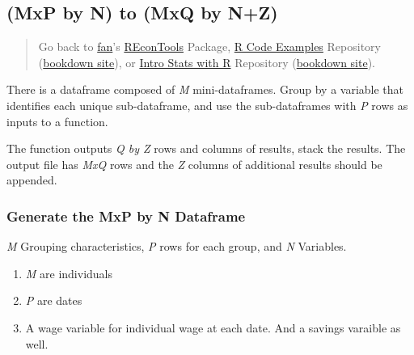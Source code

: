 \documentclass[
]{book}
\providecommand{\tightlist}{%
  \setlength{\itemsep}{0pt}\setlength{\parskip}{0pt}}
\begin{document}
\hypertarget{mxp-by-n-to-mxq-by-nz}{%
\subsection{(MxP by N) to (MxQ by N+Z)}\label{mxp-by-n-to-mxq-by-nz}}

\begin{quote}
Go back to \href{http://fanwangecon.github.io/}{fan}'s \href{https://fanwangecon.github.io/REconTools/}{REconTools} Package, \href{https://fanwangecon.github.io/R4Econ/}{R Code Examples} Repository (\href{https://fanwangecon.github.io/R4Econ/bookdown}{bookdown site}), or \href{https://fanwangecon.github.io/Stat4Econ/}{Intro Stats with R} Repository (\href{https://fanwangecon.github.io/Stat4Econ/bookdown}{bookdown site}).
\end{quote}

There is a dataframe composed of \emph{M} mini-dataframes. Group by a variable that identifies each unique sub-dataframe, and use the sub-dataframes with \emph{P} rows as inputs to a function.

The function outputs \emph{Q by Z} rows and columns of results, stack the results. The output file has \emph{MxQ} rows and the \emph{Z} columns of additional results should be appended.

\hypertarget{generate-the-mxp-by-n-dataframe}{%
\subsubsection{Generate the MxP by N Dataframe}\label{generate-the-mxp-by-n-dataframe}}

\emph{M} Grouping characteristics, \emph{P} rows for each group, and \emph{N} Variables.

\begin{enumerate}
\def\labelenumi{\arabic{enumi}.}
\tightlist
\item
  \emph{M} are individuals
\item
  \emph{P} are dates
\item
  A wage variable for individual wage at each date. And a savings varaible as well.
\end{enumerate}
\end{document}
